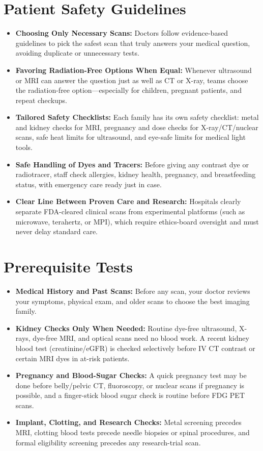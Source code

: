 \section{Patient Safety Guidelines}
\begin{itemize}
  \item \textbf{Choosing Only Necessary Scans:} Doctors follow evidence-based guidelines to pick the safest scan that truly answers your medical question, avoiding duplicate or unnecessary tests.
  \item \textbf{Favoring Radiation-Free Options When Equal:} Whenever ultrasound or MRI can answer the question just as well as CT or X-ray, teams choose the radiation-free option---especially for children, pregnant patients, and repeat checkups.
  \item \textbf{Tailored Safety Checklists:} Each family has its own safety checklist: metal and kidney checks for MRI, pregnancy and dose checks for X-ray/CT/nuclear scans, safe heat limits for ultrasound, and eye-safe limits for medical light tools.
  \item \textbf{Safe Handling of Dyes and Tracers:} Before giving any contrast dye or radiotracer, staff check allergies, kidney health, pregnancy, and breastfeeding status, with emergency care ready just in case.
  \item \textbf{Clear Line Between Proven Care and Research:} Hospitals clearly separate FDA-cleared clinical scans from experimental platforms (such as microwave, terahertz, or MPI), which require ethics-board oversight and must never delay standard care.
\end{itemize}

\section{Prerequisite Tests}
\begin{itemize}
  \item \textbf{Medical History and Past Scans:} Before any scan, your doctor reviews your symptoms, physical exam, and older scans to choose the best imaging family.
  \item \textbf{Kidney Checks Only When Needed:} Routine dye-free ultrasound, X-rays, dye-free MRI, and optical scans need no blood work. A recent kidney blood test (creatinine/eGFR) is checked selectively before IV CT contrast or certain MRI dyes in at-risk patients.
  \item \textbf{Pregnancy and Blood-Sugar Checks:} A quick pregnancy test may be done before belly/pelvic CT, fluoroscopy, or nuclear scans if pregnancy is possible, and a finger-stick blood sugar check is routine before FDG PET scans.
  \item \textbf{Implant, Clotting, and Research Checks:} Metal screening precedes MRI, clotting blood tests precede needle biopsies or spinal procedures, and formal eligibility screening precedes any research-trial scan.
\end{itemize}

